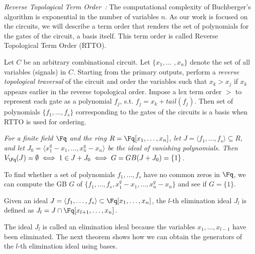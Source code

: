 \begin{Definition}
\label{def:rtto}
\par {\it Reverse Topological Term Order~\cite{lv:tcad2013}:}
The computational complexity of Buchberger's algorithm is exponential
in the number of variables $n$. As our work is focused on the circuits,
we will describe a term order that renders the set of polynomials for 
the gates of the circuit, a \Grobner basis itself. This term order 
is called Reverse Topological Term Order (RTTO).

\par Let $C$ be an arbitrary combinational
circuit. Let $\{x_1, \dots$ $, x_n\}$ denote the set of all variables
(signals) in $C$. Starting from the primary outputs, perform
a {\it reverse topological traversal} of the circuit and order the
variables such that $x_k > x_j$ if $x_k$ appears earlier in the
reverse topological order. Impose a lex term order $>$ to represent each
gate as a polynomial $f_j$, s.t. $f_j = x_k + tail(f_j)$. Then 
set of polynomials $\{f_1,\dots,f_s\}$ corresponding to the gates of the circuits 
is a \Grobner basis when RTTO is used for ordering.
\end{Definition}
\begin{Theorem}
\label{thm:weak-ns-ff}
{\it For a finite field $\Fq$ and the ring $R = \Fq[x_1, \dots, x_n]$, let
$J = \langle f_1, \dots, f_s\rangle \subseteq R$, and let $J_0 = \langle
x_1^q-x_1, \dots, x_n^q -  x_n\rangle$ be the ideal of vanishing
polynomials. Then $V_{\Fq}(J) = \emptyset \iff 1 \in J + J_0 \iff G =
GB(J+J_0) = \{1\}$. }

\par To find whether a set of polynomials $f_1,\dots,f_s$ have no common
zeros in $\Fq$, we can compute the GB $G$ of
$\{f_1,\dots,f_s,x_1^q-x_1,\dots,x_n^q-x_n\}$ and see if $G = \{1\}$. 
\end{Theorem}

\begin{Definition}
\label{def:elimideal}
Given an ideal $J = \langle f_1, \dots, f_s\rangle \subset \Fq[x_1,\dots,x_n]$, the $l$-th elimination
ideal $J_l$ is defined as $J_l = J \cap \Fq[x_{l+1},\dots,x_n]$.
\end{Definition}

The ideal $J_l$ is called an elimination ideal because the variables $x_1,\dots,x_{l-1}$
have been eliminated.
The next theorem shows how we can obtain the generators of the $l$-th
elimination ideal using \Grobner bases.


